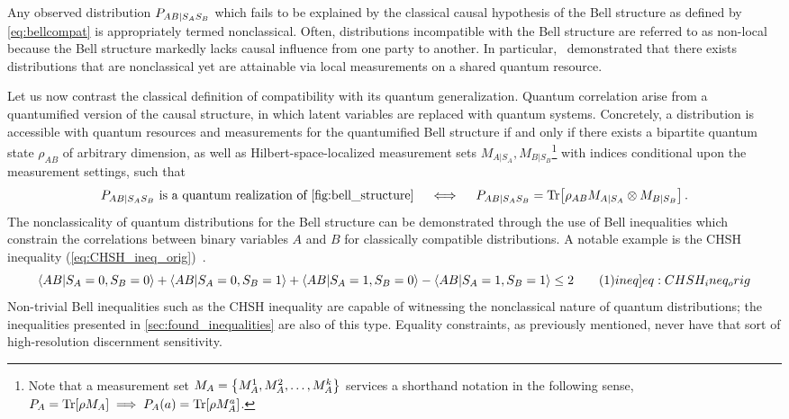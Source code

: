 \documentclass[aps, 10pt, english, twoside, pra, nofootinbib, tightenlines, longbibliography, superscriptaddress]{revtex4-1}
\begin{document}
    Any observed distribution $\prob[AB|S_AS_B]$ which fails to be explained by the classical causal hypothesis of the Bell structure as defined by \cref{eq:bellcompat} is appropriately termed nonclassical. Often, distributions incompatible with the Bell structure are referred to as non-local because the Bell structure markedly lacks causal influence from one party to another. In particular,~\citet{Bell_1964} demonstrated that there exists distributions that are nonclassical yet are attainable via local measurements on a shared quantum resource.

    Let us now contrast the classical definition of compatibility with its quantum generalization. Quantum correlation arise from a quantumified version of the causal structure, in which latent variables are replaced with quantum systems. Concretely, a distribution is accessible with quantum resources and measurements for the quantumified Bell structure if and only if there exists a bipartite quantum state $\rho_{AB}$ of arbitrary dimension, as well as Hilbert-space-localized measurement sets $M_{A|S_A}, M_{B|S_B}$\footnote{Note that a measurement set $M_{A} = \bc{M_{A}^{1}, M_{A}^{2}, \ldots, M_{A}^{k}}$ services a shorthand notation in the following sense, $\prob[A] = \Tr\bs{\rho M_{A}} \implies \prob[A]\br{a} = \Tr\bs{\rho M_{A}^{a}}$.} with indices conditional upon the measurement settings, such that
    \begin{align}\label{eq:bellQcompat}
    \prob[AB|S_AS_B] \text{ is a quantum realization of \cref{fig:bell_structure}} \quad\iff\quad\prob[AB|S_AS_B] = \Tr\bs{\rho_{AB}M_{A|S_A}\otimes M_{B|S_B}}\,.
    \end{align}
    The nonclassicality of quantum distributions for the Bell structure can be demonstrated through the use of Bell inequalities which constrain the correlations between binary variables $A$ and $B$ for classically compatible distributions. A notable example is the CHSH inequality (\cref{eq:CHSH_ineq_orig})~\cite{CHSH_Original}.
    \[ \ba{AB | S_{A} = 0, S_{B} = 0} + \ba{AB | S_{A} = 0, S_{B} = 1} + \ba{AB | S_{A} = 1, S_{B} = 0} - \ba{AB | S_{A} = 1, S_{B} = 1} \leq 2 \eq \label[ineq]{eq:CHSH_ineq_orig} \]
    Non-trivial Bell inequalities such as the CHSH inequality are capable of witnessing the nonclassical nature of quantum distributions; the inequalities presented in \cref{sec:found_inequalities} are also of this type. Equality constraints, as previously mentioned, never have that sort of high-resolution discernment sensitivity.
\end{document}
